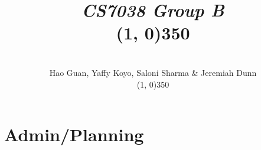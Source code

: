 \documentclass[12pt]{article}
\title{\vspace{-4cm}\textit{CS7038 Group B}\hspace{0.75cm}\\\line(1, 0){350}
}
\author
{\vspace{-1.2cm}\\Hao Guan, Yaffy Koyo, Saloni Sharma \& Jeremiah Dunn\\\line(1, 0){350}}
\date{}
\begin{document}
 

\maketitle 









\section{Admin/Planning}









\end{document}
